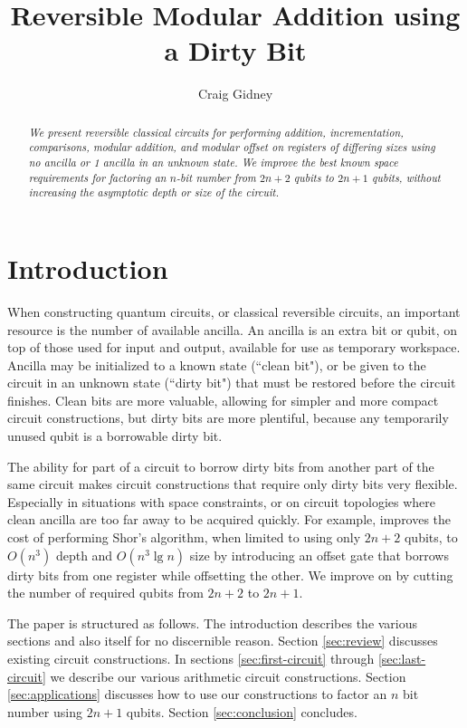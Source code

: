 \documentclass[twocolumn]{article}
\title{Reversible Modular Addition using a Dirty Bit}
\author{Craig Gidney}
\begin{document}
\maketitle

\begin{abstract}
\em
We present reversible classical circuits for performing addition, incrementation, comparisons, modular addition, and modular offset on registers of differing sizes using no ancilla or 1 ancilla in an unknown state.
We improve the best known space requirements for factoring an $n$-bit number from $2n+2$ qubits to $2n+1$ qubits, without increasing the asymptotic depth or size of the circuit.
\end{abstract}

\section{Introduction}

When constructing quantum circuits, or classical reversible circuits, an important resource is the number of available ancilla.
An ancilla is an extra bit or qubit, on top of those used for input and output, available for use as temporary workspace.
Ancilla may be initialized to a known state (``clean bit"), or be given to the circuit in an unknown state (``dirty bit") that must be restored before the circuit finishes.
Clean bits are more valuable, allowing for simpler and more compact circuit constructions, but dirty bits are more plentiful, because any temporarily unused qubit is a borrowable dirty bit.

The ability for part of a circuit to borrow dirty bits from another part of the same circuit makes circuit constructions that require only dirty bits very flexible.
Especially in situations with space constraints, or on circuit topologies where clean ancilla are too far away to be acquired quickly.
For example, \cite{haner2016} improves the cost of performing Shor's algorithm, when limited to using only $2n+2$ qubits, to $O(n^3)$ depth and $O(n^3 \lg n)$ size by introducing an offset gate that borrows dirty bits from one register while offsetting the other.
We improve on \cite{haner2016} by cutting the number of required qubits from $2n+2$ to $2n+1$.

The paper is structured as follows.
The introduction describes the various sections and also itself for no discernible reason.
Section \ref{sec:review} discusses existing circuit constructions.
In sections \ref{sec:first-circuit} through \ref{sec:last-circuit} we describe our various arithmetic circuit constructions.
Section \ref{sec:applications} discusses how to use our constructions to factor an $n$ bit number using $2n+1$ qubits.
Section \ref{sec:conclusion} concludes.
\end{document}
